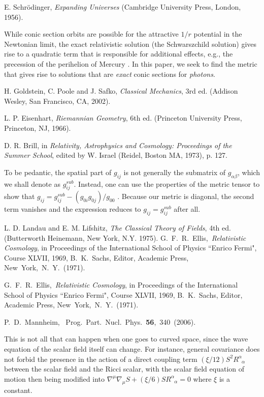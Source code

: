 \begin{thebibliography}{10}
E. Schr\"{o}dinger, \textit{Expanding Universes} (Cambridge University Press, London, 1956).

While conic section orbits are possible for the attractive $1/r$ potential in the Newtonian limit, the exact relativistic solution (the Schwarszchild solution) gives rise to a quadratic term that is responsible for additional effects, e.g., the precession of the perihelion of Mercury \cite{ABS}. In this paper, we seek to find the metric that gives rise to solutions that are \textit{exact} conic sections for \textit{photons}.

H. Goldstein, C. Poole and J. Safko, \textit{Classical Mechanics}, 3rd ed. (Addison Wesley, San Francisco, CA, 2002).

L. P. Eisenhart, \textit{Riemannian Geometry}, 6th ed. (Princeton University Press, Princeton, NJ, 1966).

D. R. Brill, in \textit{Relativity, Astrophysics and Cosmology: Proceedings of the Summer School}, edited by W. Israel (Reidel, Boston MA, 1973), p. 127.

To be pedantic, the spatial part of $g_{ij}$ is not generally the submatrix of $g_{\alpha\beta}$, which we shall denote as $g^{sub}_{ij}$. Instead, one can use the properties of the metric tensor to show that $g_{ij}=g^{sub}_{ij}-(g_{0i}g_{0j})/g_{00}$ \cite{LL}. Because our metric is diagonal, the second term vanishes and the expression reduces to $g_{ij}=g^{sub}_{ij}$ after all.

L. D. Landau and E. M. Lifshitz, \textit{The Classical Theory of Fields}, 4th ed. (Butterworth Heinemann, New York, N.Y. 1975).
 G.~F.~R.~Ellis,~{\it Relativistic Cosmology}, in Proceedings of the International School of Physics ``Enrico Fermi", Course XLVII, 1969, B.~K.~Sachs, Editor, Academic Press, New~York,~N.~Y.~(1971).

 G.~F.~R.~Ellis,~{\it Relativistic Cosmology}, in Proceedings of the International School of Physics ``Enrico Fermi", Course XLVII, 1969, B.~K.~Sachs, Editor, Academic Press, New~York,~N.~Y.~(1971).

 P.~D.~Mannheim,~ Prog.~Part.~Nucl.~Phys.~{\bf 56},~340~(2006). 

 This is not all that can happen when one goes to curved space, since the wave equation of the scalar field itself can change. For instance, general covariance does not forbid the presence in the action of a direct coupling term $(\xi/12)S^2R^{\alpha}_{\phantom{\alpha}\alpha}$ between the scalar field and the Ricci scalar, with the scalar field equation of motion then being modified into $\nabla^{\mu}\nabla_{\mu}S+(\xi/6) SR^{\alpha}_{\phantom{\alpha}\alpha}=0$ where $\xi$ is a constant.



\end{thebibliography}
